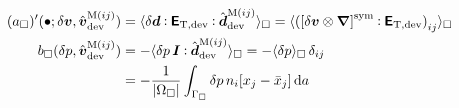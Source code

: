 \documentclass[10pt,a4paper]{article}
\begin{document}
\begin{align}
    (a_\Box)'(\bullet; \delta\boldsymbol{v},\hat{\boldsymbol{v}}^{\mathrm{M}(ij)}_{\mathrm{dev}})
    & = 
    \langle \delta \boldsymbol{d} \mathbin{\vcentcolon} \boldsymbol{\mathsf{E}}_{\mathrm{T},\mathrm{dev}} \mathbin{\vcentcolon} \hat{\boldsymbol{d}}^{\mathrm{M}(ij)}_{\mathrm{dev}} \rangle_\Box
    =
    \langle \left(\left[\delta\boldsymbol{v}\mathbin{\otimes}\boldsymbol{\nabla}\right]^{\mathrm{sym}} \mathbin{\vcentcolon} \boldsymbol{\mathsf{E}}_{\mathrm{T},\mathrm{dev}}\right)_{ij} \rangle_\Box
\label{eq263a}
\\
    b_\Box(\delta p,\hat{\boldsymbol{v}}^{\mathrm{M}(ij)}_{\mathrm{dev}})
    & = 
    - \langle \delta p\,\boldsymbol{I}\mathbin{\vcentcolon}\hat{\boldsymbol{d}}^{\mathrm{M}(ij)}_{\mathrm{dev}} \rangle_\Box =
    - \langle \delta p \rangle_\Box\, \delta_{ij}
\nonumber
\\
    & = 
    - \frac{1}{|\Omega_\Box|}\int_{\Gamma_\Box} \delta p\, n_i [x_j-\bar{x}_j] \operatorname{d \!} a
\label{eq263b}
\end{align}
%
\end{document}
